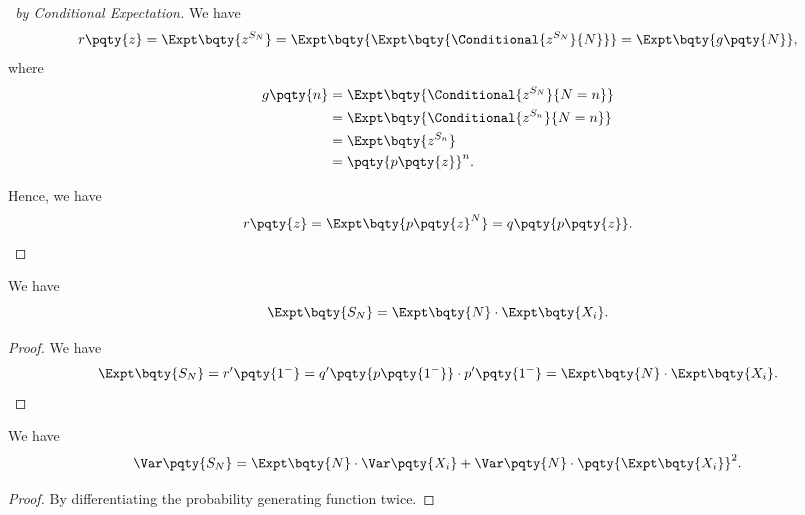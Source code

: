 \begin{proof}[\proofname\ by Conditional Expectation]
    We have
    \[
        r\pqty{z} = \Expt\bqty{z^{S_N}} = \Expt\bqty{\Expt\bqty{\Conditional{z^{S_N}}{N}}} = \Expt\bqty{g\pqty{N}},
    \]
    where
    \begin{align*}
        g\pqty{n} &= \Expt\bqty{\Conditional{z^{S_N}}{N=n}} \\
        &= \Expt\bqty{\Conditional{z^{S_n}}{N = n}} \\
        &= \Expt\bqty{z^{S_n}} \\
        &= \pqty{p\pqty{z}}^{n}.
    \end{align*}

    Hence, we have
    \[
        r\pqty{z} = \Expt\bqty{p\pqty{z}^{N}} = q\pqty{p\pqty{z}}.
    \]
\end{proof}

\begin{corollary}
    \label{cor:expt-random-sum}%
    We have
    \[
        \Expt\bqty{S_N} = \Expt\bqty{N} \cdot \Expt\bqty{X_i}.
    \]
\end{corollary}

\begin{proof}
    We have
    \[
        \Expt\bqty{S_N} = r' \pqty{1^-} = q' \pqty{p\pqty{1^-}} \cdot p'\pqty{1^-} = \Expt\bqty{N} \cdot \Expt\bqty{X_i}.
    \]
\end{proof}

\begin{corollary}
    \label{cor:var-random-sum}%
    We have
    \[
        \Var\pqty{S_N} = \Expt\bqty{N} \cdot \Var\pqty{X_i} + \Var\pqty{N} \cdot \pqty{\Expt\bqty{X_i}}^2.
    \]
\end{corollary}

\begin{proof}
    By differentiating the probability generating function twice.
\end{proof}